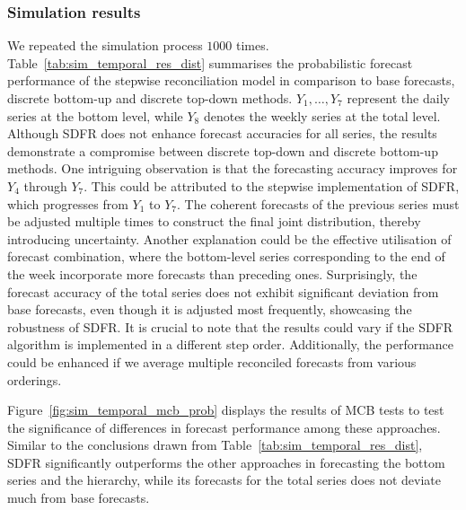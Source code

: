 \documentclass[a4paper,review,12pt,authoryear]{elsarticle}
\theoremstyle{definition}
\begin{document}
     \subsubsection{Simulation results}
     We repeated the simulation process $1000$ times.
     Table~\ref{tab:sim_temporal_res_dist} summarises the probabilistic forecast performance of the stepwise reconciliation model in comparison to base forecasts, discrete bottom-up and discrete top-down methods.
     $Y_1,\dots,Y_7$ represent the daily series at the bottom level, while $Y_8$ denotes the weekly series at the total level.
     Although SDFR does not enhance forecast accuracies for all series, the results
     demonstrate a compromise between discrete top-down and discrete bottom-up methods.
     One intriguing observation is that the forecasting accuracy improves for $Y_4$ through $Y_7$.
     This could be attributed to the stepwise implementation of SDFR, which progresses from $Y_1$ to $Y_7$. The coherent forecasts of the previous series must be adjusted multiple times to construct the final joint distribution, thereby introducing uncertainty.
     Another explanation could be the effective utilisation of forecast combination, where the bottom-level series corresponding to the end of the week incorporate more forecasts than preceding ones.
     Surprisingly, the forecast accuracy of the total series does not exhibit significant deviation from base forecasts,  even though it is adjusted most frequently, showcasing the robustness of SDFR.
     It is crucial to note that the results could vary if the SDFR algorithm is implemented in a different step order.
     Additionally, the performance could be enhanced if we average multiple reconciled forecasts from various orderings.

     Figure~\ref{fig:sim_temporal_mcb_prob} displays the results of MCB tests to test the significance of differences in forecast performance among these approaches. Similar to the conclusions drawn from Table~\ref{tab:sim_temporal_res_dist}, SDFR significantly outperforms the other approaches in forecasting the bottom series and the hierarchy, while its forecasts for the total series does not deviate much from base forecasts.
\end{document}
